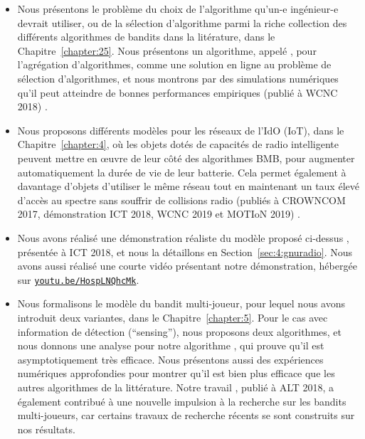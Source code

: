 \begin{resume_fr}
\begin{itemize}
    \item
    Nous présentons le problème du choix de l'algorithme qu'un-e ingénieur-e devrait utiliser, ou de la sélection d'algorithme parmi la riche collection des différents algorithmes de bandits dans la litérature, dans le Chapitre~\ref{chapter:25}.
    Nous présentons un algorithme, appelé \Aggr, pour l'agrégation d'algorithmes, comme une solution en ligne au problème de sélection d'algorithmes, et nous montrons par des simulations numériques qu'il peut atteindre de bonnes performances empiriques
    (publié à WCNC 2018) \cite{Besson2018WCNC}.

    \item
    Nous proposons différents modèles pour les réseaux de l'IdO (IoT), dans le Chapitre~\ref{chapter:4}, où les objets dotés de capacités de radio intelligente peuvent mettre en œuvre de leur côté des algorithmes BMB, pour augmenter automatiquement la durée de vie de leur batterie.
    Cela permet également à davantage d'objets d'utiliser le même réseau tout en maintenant un taux élevé d'accès au spectre sans souffrir de collisions radio
    (publiés à CROWNCOM 2017, démonstration ICT 2018, WCNC 2019 et MOTIoN 2019)
    \cite{Bonnefoi17,Besson2018ICT,Besson2019WCNC,Bonnefoi2019WCNC}.

    \item
    Nous avons réalisé une démonstration réaliste du modèle proposé ci-dessus \cite{Besson2018ICT,Besson2019WCNC}, présentée à ICT 2018, et nous la détaillons en Section~\ref{sec:4:gnuradio}. Nous avons aussi réalisé une courte vidéo présentant notre démonstration, hébergée sur \texttt{\href{https://youtu.be/HospLNQhcMk}{youtu.be/HospLNQhcMk}}.


    \item
    Nous formalisons le modèle du bandit multi-joueur, pour lequel nous avons introduit deux variantes, dans le Chapitre~\ref{chapter:5}.
    Pour le cas avec information de détection (``sensing''), nous proposons deux algorithmes, et nous donnons une analyse pour notre algorithme \MCTopM, qui prouve qu'il est asymptotiquement très efficace.
    Nous présentons aussi des expériences numériques approfondies pour montrer qu'il est bien plus efficace que les autres algorithmes de la littérature.
    Notre travail \cite{Besson2018ALT}, publié à ALT 2018, a également contribué à une nouvelle impulsion à la recherche sur les bandits multi-joueurs, car certains travaux de recherche récents se sont construits sur nos résultats.


\end{itemize}
\end{resume_fr}
